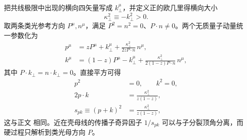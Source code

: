 \begin{derivation}
把共线极限中出现的横向四矢量写成 $k_\perp^\mu$，并定义正的欧几里得横向大小
\begin{equation*}
 \kappa_\perp^2\equiv-k_\perp^2>0.
\end{equation*}
取两条类光参考方向 $P^\mu,n^\mu$，满足 $P^2=n^2=0$、$P\cdot n\neq0$。两个无质量子动量统一参数化为
\begin{align*}
 p^\mu
 &=zP^\mu+k_\perp^\mu
 +\frac{\kappa_\perp^2}{2zP\cdot n}\,n^\mu,\\
 k^\mu
 &=(1-z)P^\mu-k_\perp^\mu
 +\frac{\kappa_\perp^2}{2(1-z)P\cdot n}\,n^\mu,
\end{align*}
其中 $P\cdot k_\perp=n\cdot k_\perp=0$。直接平方可得
\begin{align*}
 p^2&=0,\qquad k^2=0,\\
 2p\cdot k
 &=\frac{\kappa_\perp^2}{z(1-z)},\\
 s_{pk}\equiv(p+k)^2
 &=\frac{\kappa_\perp^2}{z(1-z)},
\end{align*}
这与正文 相同。近在壳母线的传播子奇异因子 $1/s_{pk}$ 可以与子分裂顶角分离，而硬过程只解析到类光母方向 $P$。


\end{derivation}
